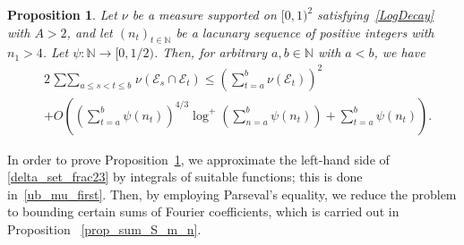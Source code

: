 \documentclass[12pt, reqno]{amsart}
\newtheorem{prop}[thm]{Proposition}
\theoremstyle{definition}
\theoremstyle{remark}
\numberwithin{equation}{section}
\def\le{\leqslant} \def\ge{\geqslant}
\def\leq{\leqslant}
\def \bN {\mathbb N}
\def \cA {\mathcal A}
\def \cE {\mathcal E}
\begin{document}

\begin{prop}  \label{indieMainThm} Let $\nu$ be a measure supported on $[0,1)^2$ satisfying~\eqref{LogDecay} 
with $A>2$, and let $(n_t)_{t\in \bN} $ be a lacunary sequence of positive integers with $n_1 > 4$.
Let $\psi:\mathbb{N}\to[0,1/2)$. Then, for arbitrary  $a,b \in \mathbb{N}$ with $a < b$, we have 
\begin{equation}
\label{delta_set_frac23}
\begin{aligned}
	& 2 
	\mathop{\sum\sum}_{a\leq s<t\leq b} \nu(\cE_{s}\cap \cE_{t}) \le \left( \sum_{t=a}^{b} \nu(\cE_{t}) \right)^2 \\
	&+ O\left(\left(
	\sum_{t=a}^{b}\psi(n_t)\right)^{4/3}
	\log^+\left(\sum_{n=a}^{b}
	\psi(n_t)\right)
	+\sum_{t=a}^{b}\psi(n_t)\right).
\end{aligned} \end{equation}
\end{prop}



In order to prove %
Proposition~\ref{indieMainThm}, we approximate the left-hand side of \eqref{delta_set_frac23} by integrals of suitable functions; this is done in~\eqref{ub_mu_first}. Then, by employing Parseval's equality, we reduce the problem to bounding certain sums of Fourier coefficients, which is carried out in Proposition ~\ref{prop_sum_S_m_n}.
\end{document}

